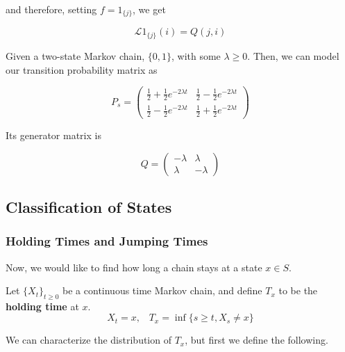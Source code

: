 \documentclass{article}
\begin{document}
\begin{example}
      and therefore, setting $f = 1_{\{j\}}$, we get 

        \[\mathscr{L} 1_{\{j\}} (i) = Q(j, i)\]
    \end{example}

    \begin{example}
      Given a two-state Markov chain, $\{0, 1\}$, with some $\lambda \geq 0$. Then, we can model our transition probability matrix as 

        \[P_s  = \begin{pmatrix} \frac{1}{2} + \frac{1}{2} e^{-2\lambda t} &  \frac{1}{2} - \frac{1}{2} e^{-2\lambda t} \\  \frac{1}{2} - \frac{1}{2} e^{-2\lambda t} &  \frac{1}{2} + \frac{1}{2} e^{-2\lambda t} \end{pmatrix} \]

      Its generator matrix is 

        \[Q = \begin{pmatrix} -\lambda & \lambda \\ \lambda & -\lambda \end{pmatrix}\]
    \end{example}

  \subsection{Classification of States}

    \subsubsection{Holding Times and Jumping Times}

      Now, we would like to find how long a chain stays at a state $x \in S$. 

      \begin{definition}
        Let $\{X_t\}_{t \geq 0}$ be a continuous time Markov chain, and define $T_x$ to be the \textbf{holding time} at $x$. 
          \[X_t = x, \;\;\; T_x = \inf\{s \geq t, X_s \neq x\} \]
      \end{definition}

      We can characterize the distribution of $T_x$, but first we define the following. 
\end{document}

